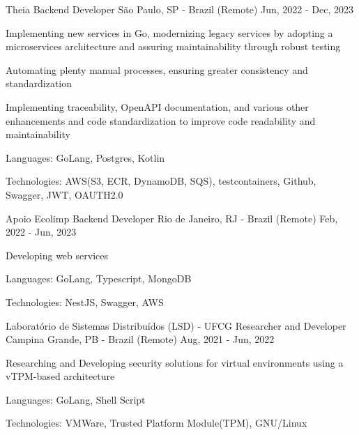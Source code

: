 
\begin{cventries}
  \cventry
  {Theia} %
  {Backend Developer} %
  {São Paulo, SP - Brazil (Remote)} %
  {Jun, 2022 - Dec, 2023} %
  {
    \begin{cvitems} %
      \item {Implementing new services in Go, modernizing legacy services by adopting a microservices architecture and assuring maintainability through robust testing}
      \item {Automating plenty manual processes, ensuring greater consistency and standardization}
      \item {Implementing traceability, OpenAPI documentation, and various other enhancements and code standardization to improve code readability and maintainability}
      \item {Languages: GoLang, Postgres, Kotlin}
      \item {Technologies: AWS(S3, ECR, DynamoDB, SQS), testcontainers, Github, Swagger, JWT, OAUTH2.0}
    \end{cvitems}
  }

  \cventry
  {Apoio Ecolimp} %
  {Backend Developer} %
  {Rio de Janeiro, RJ - Brazil (Remote)} %
  {Feb, 2022 - Jun, 2023} %
  {
    \begin{cvitems} %
      \item {Developing web services}
      \item {Languages: GoLang, Typescript, MongoDB}
      \item {Technologies: NestJS, Swagger, AWS}
    \end{cvitems}
  }

  \cventry
  {Laboratório de Sistemas Distribuídos (LSD) - UFCG} %
  {Researcher and Developer} %
  {Campina Grande, PB - Brazil (Remote)} %
  {Aug, 2021 - Jun, 2022} %
  {
    \begin{cvitems} %
      \item {Researching and Developing security solutions for virtual environments using a vTPM-based architecture}
      \item {Languages: GoLang, Shell Script}
      \item {Technologies: VMWare, Trusted Platform Module(TPM), GNU/Linux}
    \end{cvitems}
  }


\end{cventries}
